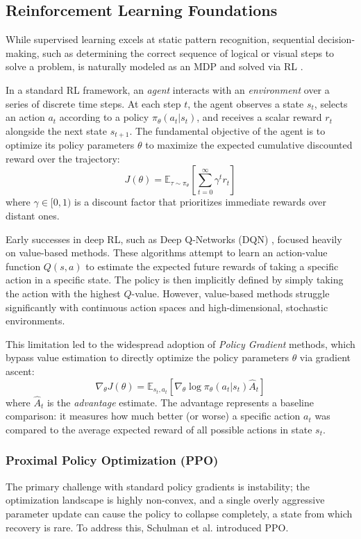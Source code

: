 \documentclass{l4proj}
\begin{document}
\subsection{Reinforcement Learning Foundations}
While supervised learning excels at static pattern recognition, sequential decision-making, such as determining the correct sequence of logical or visual steps to solve a problem, is naturally modeled as an MDP and solved via RL \citep{sutton2018reinforcement}.

In a standard RL framework, an \textit{agent} interacts with an \textit{environment} over a series of discrete time steps. At each step $t$, the agent observes a state $s_t$, selects an action $a_t$ according to a policy $\pi_\theta(a_t|s_t)$, and receives a scalar reward $r_t$ alongside the next state $s_{t+1}$. The fundamental objective of the agent is to optimize its policy parameters $\theta$ to maximize the expected cumulative discounted reward over the trajectory:
\begin{equation}
    J(\theta) = \mathbb{E}_{\tau \sim \pi_\theta} \left[ \sum_{t=0}^{\infty} \gamma^t r_t \right]
\end{equation}
where $\gamma \in [0,1)$ is a discount factor that prioritizes immediate rewards over distant ones.

Early successes in deep RL, such as Deep Q-Networks (DQN) \citep{mnih2015human}, focused heavily on value-based methods. These algorithms attempt to learn an action-value function $Q(s, a)$ to estimate the expected future rewards of taking a specific action in a specific state. The policy is then implicitly defined by simply taking the action with the highest $Q$-value. However, value-based methods struggle significantly with continuous action spaces and high-dimensional, stochastic environments.

This limitation led to the widespread adoption of \textit{Policy Gradient} methods, which bypass value estimation to directly optimize the policy parameters $\theta$ via gradient ascent:
\begin{equation}
    \nabla_\theta J(\theta) = \mathbb{E}_{s_t, a_t} \left[ \nabla_\theta \log \pi_\theta(a_t|s_t) \hat{A}_t \right]
\end{equation}
where $\hat{A}_t$ is the \textit{advantage} estimate. The advantage represents a baseline comparison: it measures how much better (or worse) a specific action $a_t$ was compared to the average expected reward of all possible actions in state $s_t$.

\subsubsection{Proximal Policy Optimization (PPO)}
The primary challenge with standard policy gradients is instability; the optimization landscape is highly non-convex, and a single overly aggressive parameter update can cause the policy to collapse completely, a state from which recovery is rare. To address this, Schulman et al. \citep{schulman2017proximal} introduced PPO.
\end{document}
